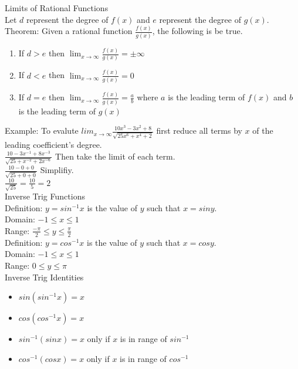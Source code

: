 \documentclass{article}
\begin{document}
\noindent
\Large
Limits of Rational Functions\\
\normalsize
\noindent
Let $d$ represent the degree of $f(x)$ and $e$ represent the degree of $g(x)$.\\
Theorem: Given a rational function $\frac{f(x)}{g(x)}$, the following is be true.
\begin{enumerate}
  \item If $d > e$ then $\lim_{x \to \infty}\frac{f(x)}{g(x)} = \pm \infty$
  \item If $d < e$ then $\lim_{x \to \infty}\frac{f(x)}{g(x)} = 0$
  \item If $d = e$ then $\lim_{x \to \infty}\frac{f(x)}{g(x)} = \frac{a}{b}$ where $a$ is the leading term of $f(x)$ and $b$ is the leading term of $g(x)$
\end{enumerate}

\noindent
Example: To evalute $lim_{x \to \infty}\frac{10x^3 - 3x^2 + 8}{\sqrt{25x^6 + x^4 + 2}}$ first reduce all terms by $x$ of the leading coefficient's degree.\\
$\frac{10 - 3x^{-1} + 8x^{-3}}{\sqrt{25 + x^{-2} + 2x^{-6}}}$ Then take the limit of each term.\\
$\frac{10 - 0 + 0}{\sqrt{25 + 0 + 0}}$ Simplifiy.\\
$\frac{10}{\sqrt{25}} = \frac{10}{5} = 2$\\

\noindent
\Large Inverse Trig Functions\\
\normalsize
\noindent
Definition: $y = sin^{-1}x$ is the value of $y$ such that $x = siny$.\\
\indent
Domain: $-1 \leq x \leq 1$\\
\indent
Range: $\frac{-\pi}{2} \leq y \leq \frac{\pi}{2}$\\

\noindent
Definition: $y = cos^{-1}x$ is the value of $y$ such that $x = cosy$.\\
\indent
Domain: $-1 \leq x \leq 1$\\
\indent
Range: $0 \leq y \leq \pi$\\

\noindent
\Large Inverse Trig Identities
\normalsize
\noindent
\begin{itemize}
  \item $sin(sin^{-1}x) = x$
  \item $cos(cos^{-1}x) = x$
  \item $sin^{-1}(sinx) = x$ only if $x$ is in range of $sin^{-1}$
  \item $cos^{-1}(cosx) = x$ only if $x$ is in range of $cos^{-1}$
\end{itemize}
\end{document}
